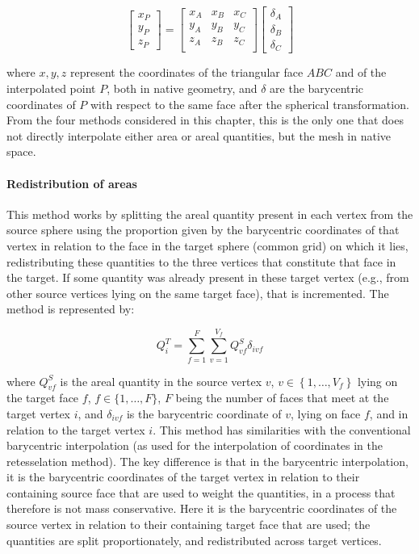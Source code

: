 $$
\left[
\begin{array}{c}
x_{P} \\
y_{P} \\
z_{P}
\end{array} \right] = \left[
\begin{array}{ccc}
x_{A} & x_{B} & x_{C} \\
y_{A} & y_{B} & y_{C} \\
z_{A} & z_{B} & z_{C} \\
\end{array}
\right] \left[
\begin{array}{c}
\delta_{A} \\
\delta_{B} \\
\delta_{C}
\end{array} \right]
$$

\noindent
where $x,y,z$ represent the coordinates of the triangular face $ABC$ and of the interpolated point $P$, both in native geometry, and $\delta$ are the barycentric coordinates of $P$ with respect to the same face after the spherical transformation. From the four methods considered in this chapter, this is the only one that does not directly interpolate either area or areal quantities, but the mesh in native space.

\paragraph{Redistribution of areas}

This method works by splitting the areal quantity present in each vertex from the source sphere using the proportion given by the barycentric coordinates of that vertex in relation to the face in the target sphere (common grid) on which it lies, redistributing these quantities to the three vertices that constitute that face in the target. If some quantity was already present in these target vertex (e.g., from other source vertices lying on the same target face), that is incremented. The method is represented by:

$$
Q^T_i = \sum_{f=1}^F\sum_{v=1}^{V_f} Q^S_{vf}\delta_{ivf}
$$

\noindent
where $Q^S_{vf}$ is the areal quantity in the source vertex $v$, $v\in\left\{1, \ldots, V_f \right\}$ lying on the target face $f$, $f\in\{1,\ldots,F\}$, $F$ being the number of faces that meet at the target vertex $i$, and $\delta_{ivf}$ is the barycentric coordinate of $v$, lying on face $f$, and in relation to the target vertex $i$. This method has similarities with the conventional barycentric interpolation (as used for the interpolation of coordinates in the retesselation method). The key difference is that in the barycentric interpolation, it is the barycentric coordinates of the target vertex in relation to their containing source face that are used to weight the quantities, in a process that therefore is not mass conservative. Here it is the barycentric coordinates of the source vertex in relation to their containing target face that are used; the quantities are split proportionately, and redistributed across target vertices.

